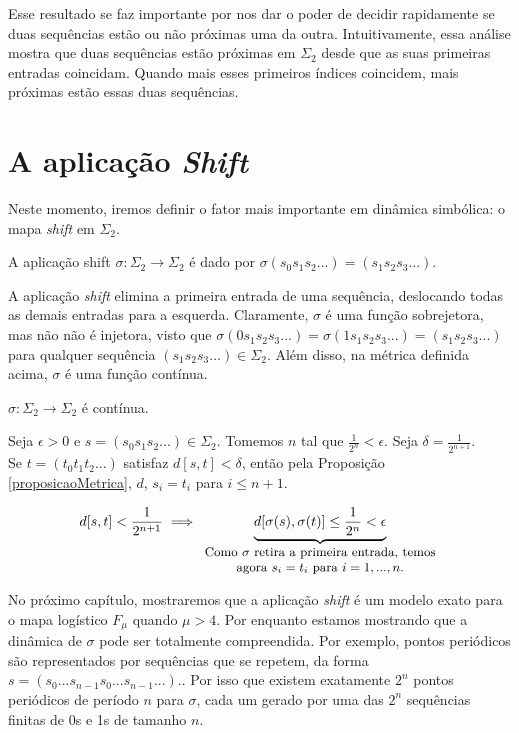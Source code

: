 \documentclass[../IC.tex]{subfiles}
\begin{document}
	Esse resultado se faz importante por nos dar o poder de decidir rapidamente se duas sequências estão ou não próximas uma da outra. Intuitivamente, essa análise mostra que duas sequências estão próximas em $\Sigma_2$ desde que as suas primeiras entradas coincidam. Quando mais esses primeiros índices coincidem, mais próximas estão essas duas sequências.
	
	\section{A aplicação \textit{Shift}}
	
	Neste momento, iremos definir o fator mais importante em dinâmica simbólica: o mapa \textit{shift} em $\Sigma_2$.
	
	\begin{definicao}
		A aplicação shift $\sigma:\Sigma_2 \rightarrow \Sigma_2$ é dado por $\sigma(s_0s_1s_2...)=(s_1s_2s_3...).$
	\end{definicao}
	
	A aplicação \textit{shift} elimina a primeira entrada de uma sequência, deslocando todas as demais entradas para a esquerda. Claramente, $\sigma$ é uma função sobrejetora, mas não não é injetora, visto que $\sigma(0s_1s_2s_3...)=\sigma(1s_1s_2s_3...)=(s_1s_2s_3...)$ para qualquer sequência $(s_1s_2s_3...) \in \Sigma_2$. Além disso, na métrica definida acima, $\sigma$ é uma função contínua.
	
	\begin{proposicao}
		$\sigma:\Sigma_2 \rightarrow \Sigma_2$ é contínua.
	\end{proposicao}
	
	\begin{prova}
		Seja $\epsilon > 0$ e $s=(s_0s_1s_2...) \in \Sigma_2$. Tomemos $n$ tal que $\frac{1}{2^n}<\epsilon$. Seja $\delta=\frac{1}{2^{n+1}}$.\\
		Se $t=(t_0t_1t_2...)$ satisfaz $d[s,t] < \delta$, então pela Proposição \ref{proposicaoMetrica}, $d$, $s_i = t_i$ para $i\leq n+1$.
		
		$$d[s,t] < \frac{1}{2^{n+1}} \implies \underbrace{d[\sigma(s),\sigma(t)] \leq \frac{1}{2^n} < \epsilon}_{\parbox{6cm}{\centering \small Como $\sigma$ retira a primeira entrada, temos agora $s_i=t_i$ para $i = 1,...,n$.}}$$
	\end{prova}
	
	No próximo capítulo, mostraremos que a aplicação \textit{shift} é um modelo exato para o mapa logístico $F_\mu$ quando $\mu>4$. Por enquanto estamos mostrando que a dinâmica de $\sigma$ pode ser totalmente compreendida. Por exemplo, pontos periódicos são representados por sequências que se repetem, da forma $s=(s_0...s_{n-1}s_0...s_{n-1}...).$. Por isso que existem exatamente $2^n$ pontos periódicos de período $n$ para $\sigma$, cada um gerado por uma das $2^n$ sequências finitas de 0s e 1s de tamanho $n$.
\end{document}
